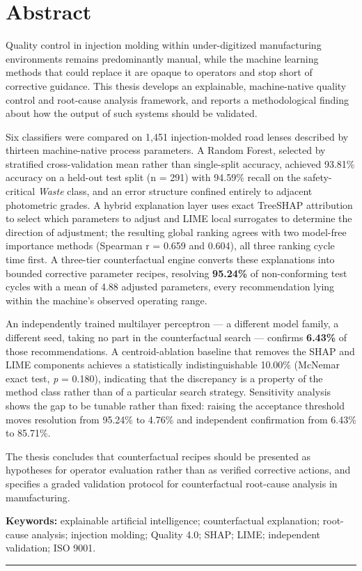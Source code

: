 \chapter*{Abstract}

Quality control in injection molding within under-digitized manufacturing environments remains predominantly manual, while the machine learning methods that could replace it are opaque to operators and stop short of corrective guidance. This thesis develops an explainable, machine-native quality control and root-cause analysis framework, and reports a methodological finding about how the output of such systems should be validated.

Six classifiers were compared on 1,451 injection-molded road lenses described by thirteen machine-native process parameters. A Random Forest, selected by stratified cross-validation mean rather than single-split accuracy, achieved 93.81\% accuracy on a held-out test split (n = 291) with 94.59\% recall on the safety-critical \emph{Waste} class, and an error structure confined entirely to adjacent photometric grades. A hybrid explanation layer uses exact TreeSHAP attribution to select which parameters to adjust and LIME local surrogates to determine the direction of adjustment; the resulting global ranking agrees with two model-free importance methods (Spearman r = 0.659 and 0.604), all three ranking cycle time first. A three-tier counterfactual engine converts these explanations into bounded corrective parameter recipes, resolving \textbf{95.24\%} of non-conforming test cycles with a mean of 4.88 adjusted parameters, every recommendation lying within the machine's observed operating range.

An independently trained multilayer perceptron --- a different model family, a different seed, taking no part in the counterfactual search --- confirms \textbf{6.43\%} of those recommendations. A centroid-ablation baseline that removes the SHAP and LIME components achieves a statistically indistinguishable 10.00\% (McNemar exact test, \emph{p} = 0.180), indicating that the discrepancy is a property of the method class rather than of a particular search strategy. Sensitivity analysis shows the gap to be tunable rather than fixed: raising the acceptance threshold moves resolution from 95.24\% to 4.76\% and independent confirmation from 6.43\% to 85.71\%.

The thesis concludes that counterfactual recipes should be presented as hypotheses for operator evaluation rather than as verified corrective actions, and specifies a graded validation protocol for counterfactual root-cause analysis in manufacturing.

\textbf{Keywords:} explainable artificial intelligence; counterfactual explanation; root-cause analysis; injection molding; Quality 4.0; SHAP; LIME; independent validation; ISO 9001.

\begin{center}\rule{0.5\linewidth}{0.5pt}\end{center}
